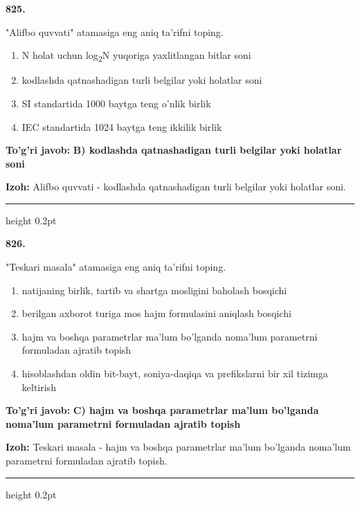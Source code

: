 \documentclass[10pt,a4paper,oneside]{article}
\begin{document}
\noindent\textbf{\color{ink}825.}
\par
"Alifbo quvvati" atamasiga eng aniq ta'rifni toping.
\begin{enumerate}[label=\Alph*),leftmargin=9mm]
\item N holat uchun log\textsubscript{2}N yuqoriga yaxlitlangan bitlar soni
\item kodlashda qatnashadigan turli belgilar yoki holatlar soni
\item SI standartida 1000 baytga teng o'nlik birlik
\item IEC standartida 1024 baytga teng ikkilik birlik
\end{enumerate}
\begin{tcolorbox}[enhanced,breakable,colback=teal!4,colframe=teal!50!black,boxrule=0.5pt,arc=1.1mm,left=3mm,right=3mm,top=1.7mm,bottom=1.7mm,before skip=2mm,after skip=2mm]
\textbf{\color{teal}To'g'ri javob:} \textbf{B) kodlashda qatnashadigan turli belgilar yoki holatlar soni}
\par\smallskip
\textbf{Izoh:} Alifbo quvvati - kodlashda qatnashadigan turli belgilar yoki holatlar soni.
\end{tcolorbox}
\vspace{2mm}\hrule height 0.2pt \vspace{3mm}

\noindent\textbf{\color{ink}826.}
\par
"Teskari masala" atamasiga eng aniq ta'rifni toping.
\begin{enumerate}[label=\Alph*),leftmargin=9mm]
\item natijaning birlik, tartib va shartga mosligini baholash bosqichi
\item berilgan axborot turiga mos hajm formulasini aniqlash bosqichi
\item hajm va boshqa parametrlar ma'lum bo'lganda noma'lum parametrni formuladan ajratib topish
\item hisoblashdan oldin bit-bayt, soniya-daqiqa va prefikslarni bir xil tizimga keltirish
\end{enumerate}
\begin{tcolorbox}[enhanced,breakable,colback=teal!4,colframe=teal!50!black,boxrule=0.5pt,arc=1.1mm,left=3mm,right=3mm,top=1.7mm,bottom=1.7mm,before skip=2mm,after skip=2mm]
\textbf{\color{teal}To'g'ri javob:} \textbf{C) hajm va boshqa parametrlar ma'lum bo'lganda noma'lum parametrni formuladan ajratib topish}
\par\smallskip
\textbf{Izoh:} Teskari masala - hajm va boshqa parametrlar ma'lum bo'lganda noma'lum parametrni formuladan ajratib topish.
\end{tcolorbox}
\vspace{2mm}\hrule height 0.2pt \vspace{3mm}
\end{document}
